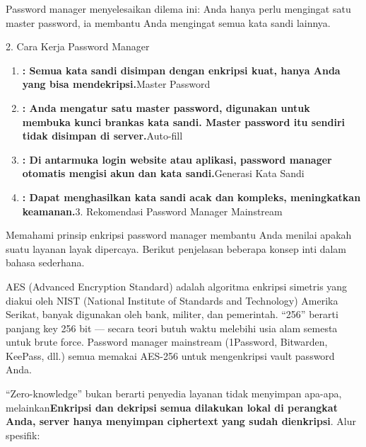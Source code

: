 


Password manager menyelesaikan dilema ini: Anda hanya perlu mengingat satu master password, ia membantu Anda mengingat semua kata sandi lainnya.

2. Cara Kerja Password Manager


\begin{enumerate}
  \item \textbf{: Semua kata sandi disimpan dengan enkripsi kuat, hanya Anda yang bisa mendekripsi.}Master Password
  \item \textbf{: Anda mengatur satu master password, digunakan untuk membuka kunci brankas kata sandi. Master password itu sendiri tidak disimpan di server.}Auto-fill
  \item \textbf{: Di antarmuka login website atau aplikasi, password manager otomatis mengisi akun dan kata sandi.}Generasi Kata Sandi
  \item \textbf{: Dapat menghasilkan kata sandi acak dan kompleks, meningkatkan keamanan.}3. Rekomendasi Password Manager Mainstream
\end{enumerate}


Memahami prinsip enkripsi password manager membantu Anda menilai apakah suatu layanan layak dipercaya. Berikut penjelasan beberapa konsep inti dalam bahasa sederhana.


AES (Advanced Encryption Standard) adalah algoritma enkripsi simetris yang diakui oleh NIST (National Institute of Standards and Technology) Amerika Serikat, banyak digunakan oleh bank, militer, dan pemerintah. “256” berarti panjang key 256 bit — secara teori butuh waktu melebihi usia alam semesta untuk brute force. Password manager mainstream (1Password, Bitwarden, KeePass, dll.) semua memakai AES-256 untuk mengenkripsi vault password Anda.


“Zero-knowledge” bukan berarti penyedia layanan tidak menyimpan apa-apa, melainkan\textbf{Enkripsi dan dekripsi semua dilakukan lokal di perangkat Anda, server hanya menyimpan ciphertext yang sudah dienkripsi}. Alur spesifik:

